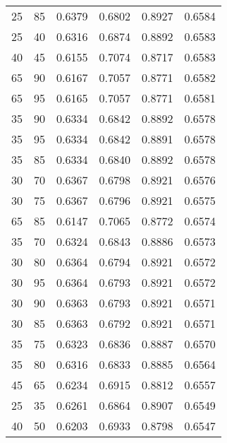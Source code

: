 \begin{center}
\begin{longtable}{|l|l|l|l|l|l|}
25                & 85                & 0.6379    & 0.6802 & 0.8927      & 0.6584    \\
25                & 40                & 0.6316    & 0.6874 & 0.8892      & 0.6583    \\
40                & 45                & 0.6155    & 0.7074 & 0.8717      & 0.6583    \\
65                & 90                & 0.6167    & 0.7057 & 0.8771      & 0.6582    \\
65                & 95                & 0.6165    & 0.7057 & 0.8771      & 0.6581    \\
35                & 90                & 0.6334    & 0.6842 & 0.8892      & 0.6578    \\
35                & 95                & 0.6334    & 0.6842 & 0.8891      & 0.6578    \\
35                & 85                & 0.6334    & 0.6840 & 0.8892      & 0.6578    \\
30                & 70                & 0.6367    & 0.6798 & 0.8921      & 0.6576    \\
30                & 75                & 0.6367    & 0.6796 & 0.8921      & 0.6575    \\
65                & 85                & 0.6147    & 0.7065 & 0.8772      & 0.6574    \\
35                & 70                & 0.6324    & 0.6843 & 0.8886      & 0.6573    \\
30                & 80                & 0.6364    & 0.6794 & 0.8921      & 0.6572    \\
30                & 95                & 0.6364    & 0.6793 & 0.8921      & 0.6572    \\
30                & 90                & 0.6363    & 0.6793 & 0.8921      & 0.6571    \\
30                & 85                & 0.6363    & 0.6792 & 0.8921      & 0.6571    \\
35                & 75                & 0.6323    & 0.6836 & 0.8887      & 0.6570    \\
35                & 80                & 0.6316    & 0.6833 & 0.8885      & 0.6564    \\
45                & 65                & 0.6234    & 0.6915 & 0.8812      & 0.6557    \\
25                & 35                & 0.6261    & 0.6864 & 0.8907      & 0.6549    \\
40                & 50                & 0.6203    & 0.6933 & 0.8798      & 0.6547    \\

\end{longtable}
\end{center}
